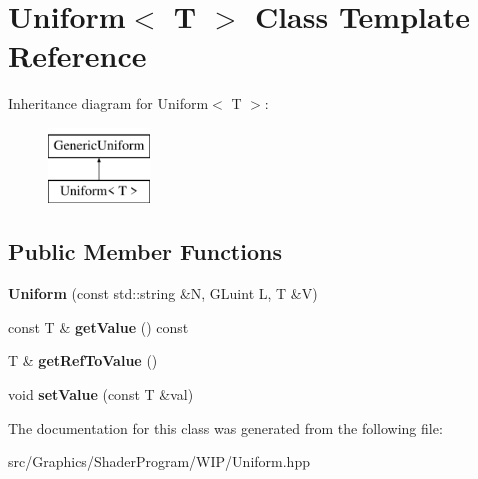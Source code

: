 \hypertarget{class_uniform}{\section{Uniform$<$ T $>$ Class Template Reference}
\label{class_uniform}
}
Inheritance diagram for Uniform$<$ T $>$\+:\begin{figure}[H]
\begin{center}
\leavevmode
\includegraphics[height=2.000000cm]{class_uniform}
\end{center}
\end{figure}
\subsection*{Public Member Functions}
\begin{DoxyCompactItemize}
\item 
\hypertarget{class_uniform_af7f95b778e5625ce1416208a18ee1b47}{{\bfseries Uniform} (const std\+::string \&N, G\+Luint L, T \&V)}\label{class_uniform_af7f95b778e5625ce1416208a18ee1b47}

\item 
\hypertarget{class_uniform_a52faf85388dfdf7e093fe9c50552309a}{const T \& {\bfseries get\+Value} () const }\label{class_uniform_a52faf85388dfdf7e093fe9c50552309a}

\item 
\hypertarget{class_uniform_a1965859a7d6949b9b93bd04228986506}{T \& {\bfseries get\+Ref\+To\+Value} ()}\label{class_uniform_a1965859a7d6949b9b93bd04228986506}

\item 
\hypertarget{class_uniform_aaf1506224a2db50568592d2d1ba69903}{void {\bfseries set\+Value} (const T \&val)}\label{class_uniform_aaf1506224a2db50568592d2d1ba69903}

\end{DoxyCompactItemize}


The documentation for this class was generated from the following file\+:\begin{DoxyCompactItemize}
\item 
src/\+Graphics/\+Shader\+Program/\+W\+I\+P/Uniform.\+hpp\end{DoxyCompactItemize}
